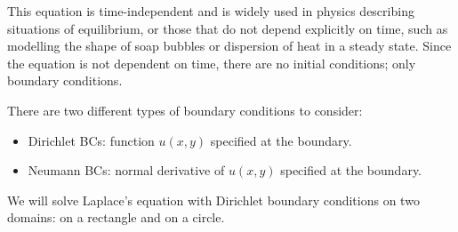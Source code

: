 This equation is time-independent and is widely used in physics describing situations of equilibrium, or those that do not depend explicitly on time, such as modelling the shape of soap bubbles or dispersion of heat in a steady state. Since the equation is not dependent on time, there are no initial conditions; only boundary conditions.

There are two different types of boundary conditions to consider:
\begin{itemize}
	\item Dirichlet BCs: function $u(x,y)$ specified at the boundary.
	\item Neumann BCs: normal derivative of $u(x,y)$ specified at the boundary.
\end{itemize}

We will solve Laplace's equation with Dirichlet boundary conditions on two domains: on a rectangle and on a circle.


